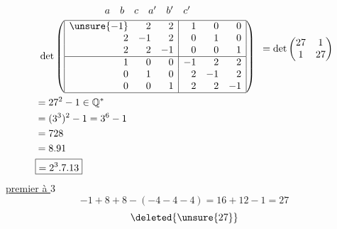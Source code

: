 \[\begin{aligned}
&\begin{array}{c}
\begin{array}{rrrrrr}a&b&c&a'&b'&c'\end{array}\\[.3em]
\det\left(\begin{array}{|rrr|rrr|}\hline
\unsure{-1}&2&2&1&0&0\\
2&-1&2&0&1&0\\
2&2&-1&0&0&1\\\hline
1&0&0&-1&2&2\\
0&1&0&2&-1&2\\
0&0&1&2&2&-1\\\hline
\end{array}\right)
\end{array}
=\det\begin{pmatrix}27&1\\1&27\end{pmatrix}\\
&=27^2-1\in\mathbb Q^*\\
&=(3^3)^2-1=3^6-1\\
&=728\\
&=8.91\\
&\boxed{=2^3.7.13}
\end{aligned}\]
\uline{premier à $3$}
\[-1+8+8-(-4-4-4)=16+12-1=27\]
\[\deleted{\unsure{27}}\]
